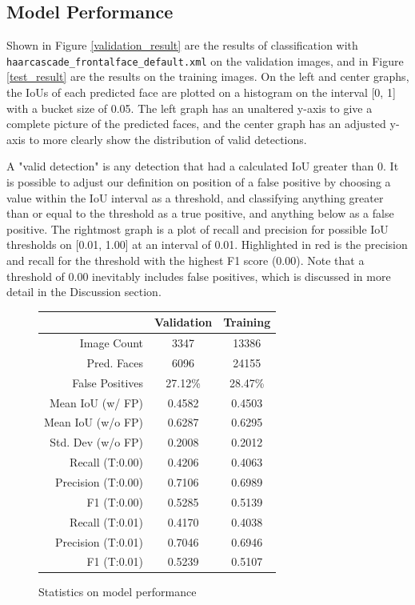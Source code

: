 \documentclass[conference]{IEEEtran}
\begin{document}
\subsection{Model Performance}

Shown in Figure \ref{validation_result} are the results of classification with \texttt{haarcascade\_frontalface\_default.xml} on the validation images, and in Figure \ref{test_result} are the results on the training images. On the left and center graphs, the IoUs of each predicted face are plotted on a histogram on the interval [0, 1] with a bucket size of 0.05. The left graph has an unaltered y-axis to give a complete picture of the predicted faces, and the center graph has an adjusted y-axis to more clearly show the distribution of valid detections. 

A "valid detection" is any detection that had a calculated IoU greater than 0. It is possible to adjust our definition on position of a false positive by choosing a value within the IoU interval as a threshold, and classifying anything greater than or equal to the threshold as a true positive, and anything below as a false positive. The rightmost graph is a plot of recall and precision for possible IoU thresholds on [0.01, 1.00] at an interval of 0.01. Highlighted in red is the precision and recall for the threshold with the highest F1 score (0.00). Note that a threshold of 0.00 inevitably includes false positives, which is discussed in more detail in the Discussion section. 

\begin{figure}[htbp]
\centering
\begin{tabular}{|r|c|c|} \hline
  & Validation & Training \\ \hline
Image Count & 3347 & 13386 \\ \hline
Pred. Faces & 6096 & 24155 \\ \hline
False Positives & 27.12\% & 28.47\% \\ \hline
Mean IoU (w/ FP) & 0.4582 & 0.4503 \\ \hline
Mean IoU (w/o FP) & 0.6287 & 0.6295 \\ \hline 
Std. Dev (w/o FP) & 0.2008 & 0.2012 \\ \hline
Recall (T:0.00)& 0.4206 & 0.4063 \\ \hline
Precision (T:0.00) & 0.7106 & 0.6989 \\ \hline
F1 (T:0.00) & 0.5285 & 0.5139 \\ \hline
Recall (T:0.01)& 0.4170 & 0.4038 \\ \hline
Precision (T:0.01) & 0.7046 & 0.6946 \\ \hline
F1 (T:0.01) & 0.5239 & 0.5107 \\ \hline
\end{tabular}
\caption{Statistics on model performance}
\captionsetup{justification=centering}
\label{tabulated_model_results}
\vspace{-2em}
\end{figure}
\end{document}
